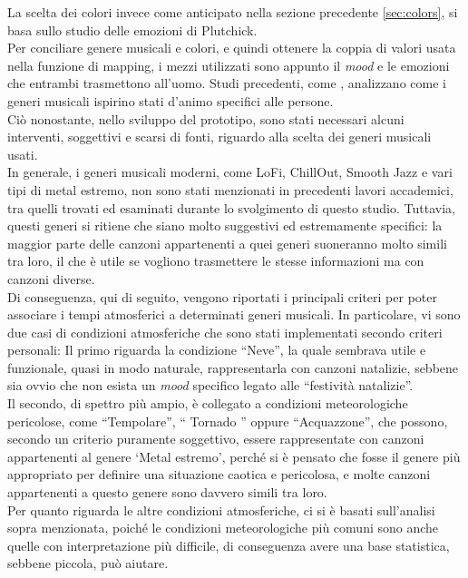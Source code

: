 \documentclass[12pt,a4paper]{report}
\begin{document}
La scelta dei colori invece come anticipato nella sezione precedente \ref{sec:colors}, si basa sullo studio delle emozioni di Plutchick\cite{plutchik2001nature}. \\
Per conciliare genere musicali e colori, e quindi ottenere la coppia di valori usata nella funzione di mapping, i mezzi utilizzati sono appunto il \textit{mood} e le emozioni che entrambi trasmettono all'uomo. Studi precedenti, come \cite{predictingmoodonmusicgenre}, analizzano come i generi musicali ispirino stati d'animo specifici alle persone.\\

Ciò nonostante, nello sviluppo del prototipo, sono stati necessari alcuni interventi, soggettivi e scarsi di fonti, riguardo alla scelta dei generi musicali usati. \\
In generale, i generi musicali moderni, come LoFi, ChillOut, Smooth Jazz e vari tipi di metal estremo, non sono stati menzionati in precedenti lavori accademici, tra quelli trovati ed esaminati durante lo svolgimento di questo studio. Tuttavia, questi generi si ritiene che siano molto suggestivi ed estremamente specifici: la maggior parte delle canzoni appartenenti a quei generi suoneranno molto simili tra loro, il che è utile se vogliono trasmettere le stesse informazioni ma con canzoni diverse.\\

Di conseguenza, qui di seguito, vengono riportati i principali criteri per poter associare i tempi atmosferici a determinati generi musicali.  In particolare, vi sono due casi di condizioni atmosferiche che sono stati implementati secondo criteri personali:
Il primo riguarda la condizione ``Neve'', la quale sembrava utile e funzionale, quasi in modo naturale, rappresentarla con canzoni natalizie, sebbene sia ovvio che non esista un \textit{mood} specifico legato alle ``festività natalizie''.\\
Il secondo, di spettro più ampio, è collegato a condizioni meteorologiche pericolose, come ``Tempolare'', `` Tornado '' oppure ``Acquazzone'', che possono, secondo un criterio puramente soggettivo, essere rappresentate con canzoni appartenenti al genere `Metal estremo', perché si è pensato che fosse il genere più appropriato per definire una situazione caotica e pericolosa, e molte canzoni appartenenti a questo genere sono davvero simili tra loro.\\
Per quanto riguarda le altre condizioni atmosferiche, ci si è basati sull'analisi sopra menzionata\cite{predictingmoodonmusicgenre}, poiché le condizioni meteorologiche più comuni sono anche quelle con interpretazione più difficile, di conseguenza avere una base statistica, sebbene piccola, può aiutare.\\
\end{document}
